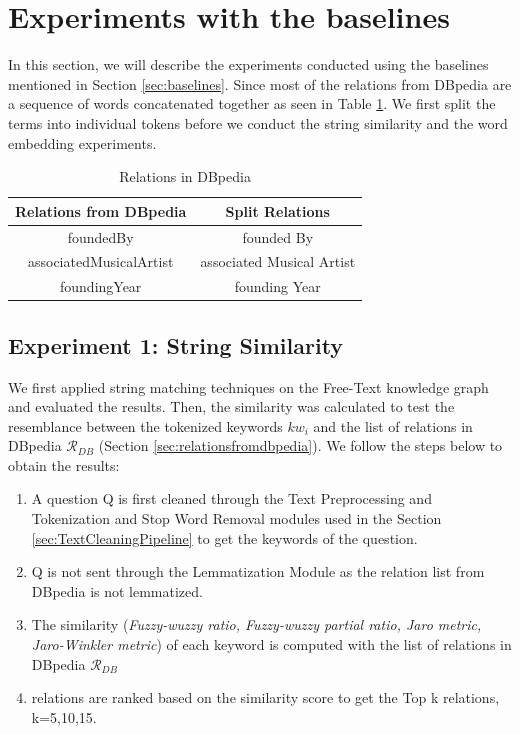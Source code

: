 \section{Experiments with the baselines}
In this section, we will describe the experiments conducted using the baselines mentioned in Section \ref{sec:baselines}.
Since most of the relations from DBpedia are a sequence of words concatenated together as seen in Table \ref{tab:relations}. We first split the terms into individual tokens before we conduct the string similarity and the word embedding experiments.
\begin{table}[H]
    \centering
    \begin{tabular}{|c|c|}
     \hline
     \textbf{Relations from DBpedia} & \textbf{Split Relations} \\
    \hline
     foundedBy & founded By \\
    \hline
    associatedMusicalArtist & associated Musical Artist \\
    \hline
    foundingYear & founding Year \\
    \hline
    \end{tabular}
    \caption{Relations in DBpedia}
    \label{tab:relations}
\end{table}
\subsection{Experiment 1: String Similarity}
We first applied string matching techniques on the Free-Text knowledge graph and evaluated the results. Then, the similarity was calculated to test the resemblance between the tokenized keywords $kw_{i}$ and the list of relations in DBpedia $\mathcal{R}_{DB}$ (Section \ref{sec:relationsfromdbpedia}). 
We follow the steps below to obtain the results:
\begin{enumerate}
\item A question Q is first cleaned through the Text Preprocessing and Tokenization and Stop Word Removal modules used in the Section \ref{sec:TextCleaningPipeline} to get the keywords of the question.
\item  Q is not sent through the Lemmatization Module as the relation list from DBpedia is not lemmatized.
\item The similarity (\textit{Fuzzy-wuzzy ratio, Fuzzy-wuzzy partial ratio, Jaro metric, Jaro-Winkler metric}) of each keyword is computed with the list of relations in DBpedia $\mathcal{R}_{DB}$
\item relations are ranked based on the similarity score to get the Top k relations, k=5,10,15.
\end{enumerate}

